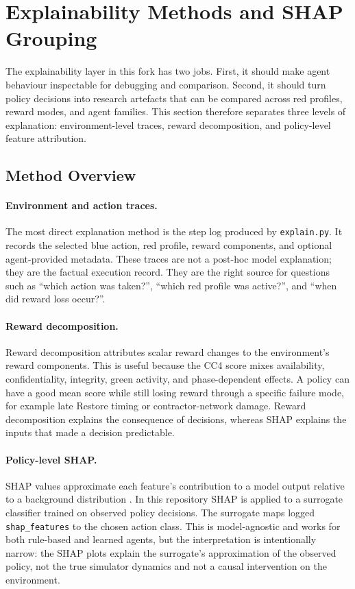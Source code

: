 \section{Explainability Methods and SHAP Grouping}

The explainability layer in this fork has two jobs. First, it should make agent
behaviour inspectable for debugging and comparison. Second, it should turn
policy decisions into research artefacts that can be compared across red
profiles, reward modes, and agent families. This section therefore separates
three levels of explanation: environment-level traces, reward decomposition, and
policy-level feature attribution.

\subsection{Method Overview}

\paragraph{Environment and action traces.}
The most direct explanation method is the step log produced by
\texttt{explain.py}. It records the selected blue action, red profile, reward
components, and optional agent-provided metadata. These traces are not a
post-hoc model explanation; they are the factual execution record. They are the
right source for questions such as ``which action was taken?'', ``which red
profile was active?'', and ``when did reward loss occur?''.

\paragraph{Reward decomposition.}
Reward decomposition attributes scalar reward changes to the environment's
reward components. This is useful because the CC4 score mixes availability,
confidentiality, integrity, green activity, and phase-dependent effects. A
policy can have a good mean score while still losing reward through a specific
failure mode, for example late Restore timing or contractor-network damage.
Reward decomposition explains the consequence of decisions, whereas SHAP
explains the inputs that made a decision predictable.

\paragraph{Policy-level SHAP.}
SHAP values approximate each feature's contribution to a model output relative
to a background distribution \cite{lundberg2017unified}. In this repository SHAP
is applied to a surrogate classifier trained on observed policy decisions. The
surrogate maps logged \texttt{shap\_features} to the chosen action class. This is
model-agnostic and works for both rule-based and learned agents, but the
interpretation is intentionally narrow: the SHAP plots explain the surrogate's
approximation of the observed policy, not the true simulator dynamics and not a
causal intervention on the environment.

